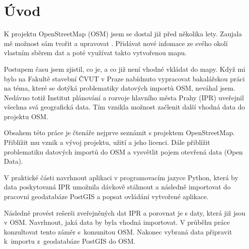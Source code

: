 \chapter{Úvod}
\label{1-uvod}

K projektu OpenStreetMap (OSM) jsem se dostal již před několika lety.
Zaujala mě možnost sám tvořit a upravovat .
Přidávat nové infomace ze svého okolí vlastním sběrem dat
a poté využívat takto vytvořenou mapu.

Postupem času jsem zjistil, co je, a co již není vhodné vkládat do mapy.
Když mi bylo na Fakultě stavební ČVUT v Praze nabídnuto vypracovat
bakalářskou práci na téma, které se dotýká problematiky datových importů OSM,
neváhal jsem. Nedávno totiž Institut plánování a rozvoje hlavního města Prahy
(IPR) uveřejnil všechna svá geografická data.
Tím vznikla možnost začlenit další vhodná data do projektu OSM.

Obsahem této práce je čtenáře nejprve seznámit s projektem
OpenStreetMap. Přiblížit mu vznik a vývoj projektu, užití a jeho licenci.
Dále přiblížit problematiku datových importů do OSM a vysvětlit
pojem otevřená data (Open Data).

V praktické části navrhnout aplikaci v programovacím jazyce Python,
která by data poskytovaná IPR umožnila dávkově stáhnout a následně
importovat do pracovní geodatabáze PostGIS a popsat ovládání
vytvořené aplikace.

Následně provést rešerši zveřejněných dat IPR a porovnat je s daty,
která již jsou v OSM. Navrhnout, jaká data by byla vhodná importovat.
V průběhu práce konzultovat tento záměr s~komunitou OSM.
Nakonec vybraná data připravit k~importu z~geodatabáze PostGIS
do OSM.
